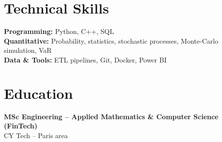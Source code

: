 \documentclass[10pt, letterpaper]{article}
\begin{document}
\section*{Technical Skills}
\textbf{Programming:} Python, C++, SQL\\
\textbf{Quantitative:} Probability, statistics, stochastic processes, Monte-Carlo simulation, VaR\\
\textbf{Data \& Tools:} ETL pipelines, Git, Docker, Power BI

\section*{Education}
\textbf{MSc Engineering -- Applied Mathematics \& Computer Science (FinTech)}\\
CY Tech -- Paris area
\end{document}
